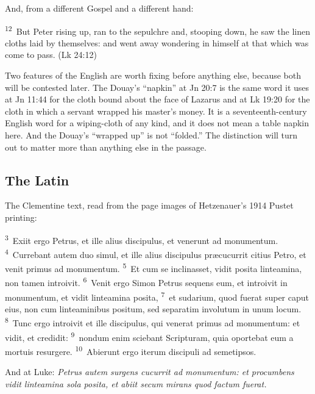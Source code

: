And, from a different Gospel and a different hand:

\begin{studyframe}\small
\textsuperscript{12}~But Peter rising up, ran to the sepulchre and, stooping
down, he saw the linen cloths laid by themselves: and went away wondering in
himself at that which was come to pass. (Lk 24:12)
\end{studyframe}

Two features of the English are worth fixing before anything else, because
both will be contested later. The Douay's ``napkin'' at Jn 20:7 is the same
word it uses at Jn 11:44 for the cloth bound about the face of Lazarus and at
Lk 19:20 for the cloth in which a servant wrapped his master's money. It is a
seventeenth-century English word for a wiping-cloth of any kind, and it does
not mean a table napkin here. And the Douay's ``wrapped up'' is not
``folded.'' The distinction will turn out to matter more than anything else in
the passage.

\subsection{The Latin}

The Clementine text, read from the page images of Hetzenauer's 1914 Pustet
printing:

\begin{studyframe}\small
\textsuperscript{3}~Exiit ergo Petrus, et ille alius discipulus, et venerunt ad
monumentum. \textsuperscript{4}~Currebant autem duo simul, et ille alius
discipulus pr\ae{}cucurrit citius Petro, et venit primus ad monumentum.
\textsuperscript{5}~Et cum se inclinasset, vidit posita linteamina, non tamen
introivit. \textsuperscript{6}~Venit ergo Simon Petrus sequens eum, et introivit
in monumentum, et vidit linteamina posita, \textsuperscript{7}~et sudarium,
quod fuerat super caput eius, non cum linteaminibus positum, sed separatim
involutum in unum locum. \textsuperscript{8}~Tunc ergo introivit et ille
discipulus, qui venerat primus ad monumentum: et vidit, et credidit:
\textsuperscript{9}~nondum enim sciebant Scripturam, quia oportebat eum a
mortuis resurgere. \textsuperscript{10}~Abierunt ergo iterum discipuli ad
semetipsos.
\end{studyframe}

And at Luke: \emph{Petrus autem surgens cucurrit ad monumentum: et procumbens
vidit linteamina sola posita, et abiit secum mirans quod factum fuerat.}

